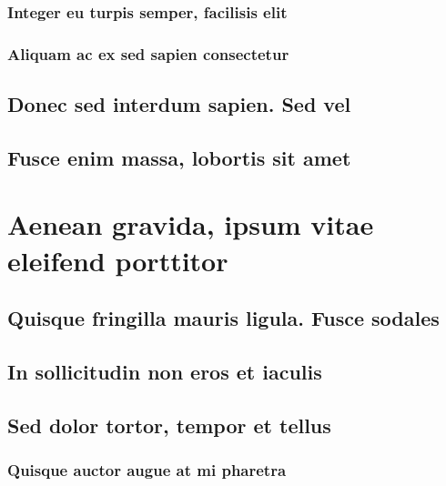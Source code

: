 \documentclass[bachelor, english, debug]{student}
\begin{document}
\lipsum[1-8]

\subsubsection{Integer eu turpis semper, facilisis elit}

\lipsum[1-8]

\subsubsection{Aliquam ac ex sed sapien consectetur}

\lipsum[1-8]

\subsection{Donec sed interdum sapien. Sed vel}

\lipsum[1-8]

\subsection{Fusce enim massa, lobortis sit amet}

\lipsum[1-8]

\section{Aenean gravida, ipsum vitae eleifend porttitor}

\lipsum[1-8]

\subsection{Quisque fringilla mauris ligula. Fusce sodales}

\lipsum[1-8]

\subsection{In sollicitudin non eros et iaculis}

\lipsum[1-8]

\subsection{Sed dolor tortor, tempor et tellus}

\lipsum[1-8]

\subsubsection{Quisque auctor augue at mi pharetra}
\end{document}
